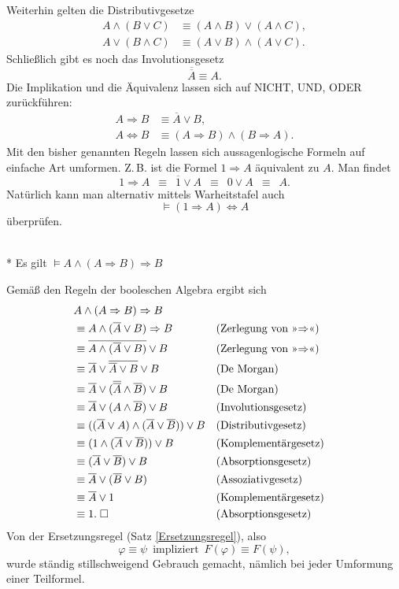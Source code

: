 Weiterhin gelten die Distributivgesetze
\begin{align}
A\land(B\lor C) &\equiv (A\land B)\lor (A\land C),\\
A\lor(B\land C) &\equiv (A\lor B)\land (A\lor C).
\end{align}
Schließlich gibt es noch das Involutionsgesetz
\begin{equation}
\overline {\overline A}\equiv A.
\end{equation}
Die Implikation und die Äquivalenz lassen sich auf NICHT, UND, ODER
zurückführen:%
\begin{align}
A\Rightarrow B &\equiv \overline A\lor B,\\
A\Leftrightarrow B &\equiv (A\Rightarrow B)\land (B\Rightarrow A).
\end{align}
Mit den bisher genannten Regeln lassen sich aussagenlogische Formeln
auf einfache Art umformen. Z.\,B. ist die Formel $1\Rightarrow A$
äquivalent zu $A$. Man findet
\[1\Rightarrow A\enspace\equiv\enspace\overline 1\lor A\enspace\equiv\enspace 0\lor A\enspace\equiv\enspace A.\]
Natürlich kann man alternativ mittels Warheitstafel auch
\[\models(1\Rightarrow A)\Leftrightarrow A\]
überprüfen.

\begin{Satz}%
\label{Formel-Modus-ponens}\mbox{}\\*
Es gilt $\models A\land (A\Rightarrow B)\Rightarrow B$
\end{Satz}
 Gemäß den Regeln der booleschen Algebra ergibt sich
\begin{align}
& A\land (A\Rightarrow B)\Rightarrow B\\
& \equiv A\land (\overline A\lor B)\Rightarrow B && \text{(Zerlegung von »$\Rightarrow$«)}\\
& \equiv \overline{A\land (\overline A\lor B)}\lor B && \text{(Zerlegung von »$\Rightarrow$«)}\\
& \equiv \overline A\lor\overline{\overline A\lor B}\lor B && \text{(De Morgan)}\\
& \equiv \overline A\lor (\overline{\overline A}\land\overline B)\lor B && \text{(De Morgan)}\\
& \equiv \overline A\lor (A\land\overline B)\lor B && \text{(Involutionsgesetz)}\\
& \equiv ((\overline A\lor A)\land(\overline A\lor\overline B))\lor B && \text{(Distributivgesetz)}\\
& \equiv (1\land(\overline A\lor\overline B))\lor B && \text{(Komplementärgesetz)}\\
& \equiv (\overline A\lor\overline B)\lor B && \text{(Absorptionsgesetz)}\\
& \equiv \overline A\lor(\overline B\lor B) && \text{(Assoziativgesetz)}\\
& \equiv \overline A\lor 1 && \text{(Komplementärgesetz)}\\
& \equiv 1.\;\Box && \text{(Absorptionsgesetz)}
\end{align}
Von der Ersetzungsregel (Satz \ref{Ersetzungsregel}), also
\[\varphi\equiv\psi\enspace
\text{impliziert}\enspace F(\varphi)\equiv F(\psi),\]
wurde ständig stillschweigend Gebrauch gemacht, nämlich bei jeder
Umformung einer Teilformel.


